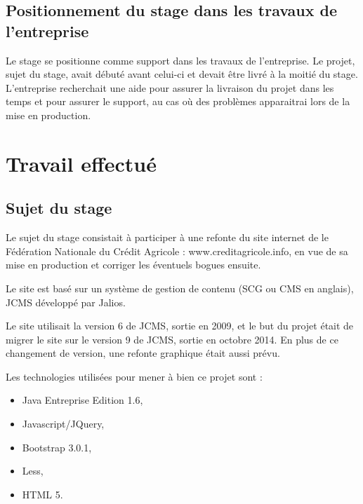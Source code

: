 \documentclass[12pt,a4paper]{article}
\begin{document}
\subsection{Positionnement du stage dans les travaux de l'entreprise}
Le stage se positionne comme support dans les travaux de l'entreprise. Le projet, sujet du stage, avait débuté avant celui-ci et devait être livré à la moitié du stage. L'entreprise recherchait une aide pour assurer la livraison du projet dans les temps et pour assurer le support, au cas où des problèmes apparaitrai lors de la mise en production.

\newpage

\section{Travail effectué}
\subsection{Sujet du stage}
Le sujet du stage consistait à participer à une refonte du site internet de le Fédération Nationale du Crédit Agricole : www.creditagricole.info, en vue de sa mise en production et corriger les éventuels bogues ensuite.\par
Le site est basé sur un système de gestion de contenu (SCG ou CMS en anglais), \gls{JCMS} développé par Jalios.\par
Le site utilisait la version 6 de \gls{JCMS}, sortie en 2009, et le but du projet était de migrer le site sur le version 9 de \gls{JCMS}, sortie en octobre 2014. En plus de ce changement de version, une refonte graphique était aussi prévu.\par
Les technologies utilisées pour mener à bien ce projet sont :
\begin{itemize}
\item Java Entreprise Edition 1.6,
\item Javascript/JQuery,
\item Bootstrap 3.0.1,
\item Less,
\item HTML 5.
\end{itemize}
\end{document}
